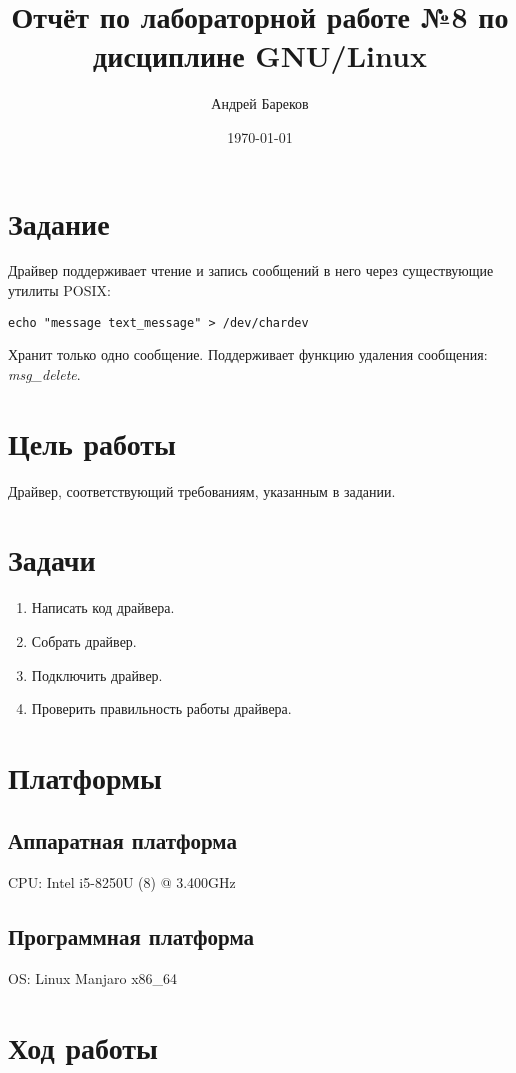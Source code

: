 \documentclass[a4paper,11pt]{article}
\title{Отчёт по лабораторной работе №8 по дисциплине GNU/Linux}
\author{Андрей Бареков}
\date{\today}
\begin{document}
\maketitle
\newpage
\lstset{style=mycode}

\section{Задание}
  Драйвер поддерживает чтение и запись сообщений в него через существующие утилиты POSIX:
    \begin{lstlisting}
echo "message text_message" > /dev/chardev
    \end{lstlisting}
  Хранит только одно сообщение. Поддерживает функцию удаления сообщения: \textit{msg\_delete}.

\section{Цель работы}
  Драйвер, соответствующий требованиям, указанным в задании.

\section{Задачи}
  \begin{enumerate}
    \item Написать код драйвера.
    \item Собрать драйвер.
    \item Подключить драйвер.
    \item Проверить правильность работы драйвера.
  \end{enumerate}

\section{Платформы}
  \subsection{Аппаратная платформа}
    CPU: Intel i5-8250U (8) @ 3.400GHz

  \subsection{Программная платформа}
    OS: Linux Manjaro x86\_64

\newpage
\section{Ход работы}
\end{document}
